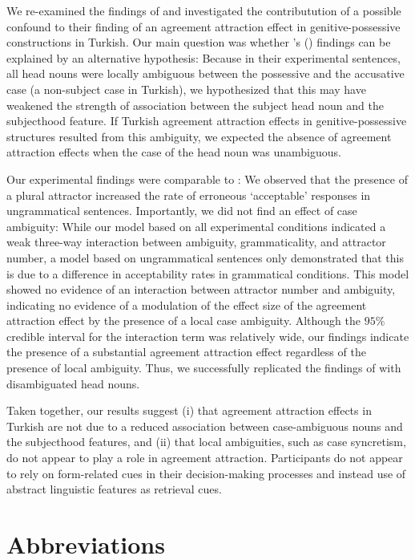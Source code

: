 \documentclass[apacite,linguex]{glossa}\usepackage[]{graphicx}\usepackage[]{color}
\begin{document}
We re-examined the findings of \citet{LagoEtAl:2019} and investigated the contributution of a possible confound to their finding of an agreement attraction effect in genitive-possessive constructions in Turkish. Our main question was whether \citeauthor{LagoEtAl:2019}'s (\citeyear{LagoEtAl:2019}) findings can be explained by an alternative hypothesis: 
Because in their experimental sentences, all head nouns were locally ambiguous between the possessive and the accusative case (a non-subject case in Turkish), we hypothesized that this may have weakened the strength of association between the subject head noun and the subjecthood feature.
If Turkish agreement attraction effects in genitive-possessive structures resulted from this ambiguity, we expected the absence of agreement attraction effects when the case of the head noun was unambiguous.  

Our experimental findings were comparable to \citet{LagoEtAl:2019}: We observed that the presence of a plural attractor increased the rate of erroneous `acceptable' responses  
in ungrammatical sentences.
Importantly, we did not find an effect of case ambiguity: While our model based on all experimental conditions indicated a weak three-way interaction between ambiguity, grammaticality, and attractor number, a model based on ungrammatical sentences only demonstrated that this is due to a difference in acceptability rates in grammatical conditions. This model showed no evidence of an interaction between attractor number and ambiguity, indicating no evidence of a modulation of the effect size of the agreement attraction effect by the presence of a local case ambiguity. 
Although the $95\%$ credible interval for the interaction term was relatively wide, our findings indicate the presence of a substantial agreement attraction effect regardless of the presence of local ambiguity.
Thus, we successfully replicated the findings of \citet{LagoEtAl:2019} with disambiguated head nouns. 

Taken together, our results suggest (i) that agreement attraction effects in Turkish are not due to a reduced association between case-ambiguous nouns and the subjecthood features, and (ii) that local ambiguities, such as case syncretism, do not appear to play a role in agreement attraction. Participants do not appear to rely on form-related cues in their decision-making processes and instead use of abstract linguistic features as retrieval cues.

\section*{Abbreviations} %
\end{document}
